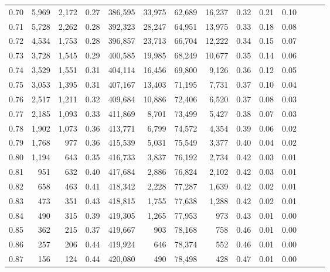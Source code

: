 \begin{tabular}{rrrrrrrrrrrrrr}
0.70 &   5,969 &  2,172 &  0.27 &  386,595 &   33,975 &  62,689 &  16,237 &  0.32 &  0.21 &      0.10 \\
0.71 &   5,728 &  2,262 &  0.28 &  392,323 &   28,247 &  64,951 &  13,975 &  0.33 &  0.18 &      0.08 \\
0.72 &   4,534 &  1,753 &  0.28 &  396,857 &   23,713 &  66,704 &  12,222 &  0.34 &  0.15 &      0.07 \\
0.73 &   3,728 &  1,545 &  0.29 &  400,585 &   19,985 &  68,249 &  10,677 &  0.35 &  0.14 &      0.06 \\
0.74 &   3,529 &  1,551 &  0.31 &  404,114 &   16,456 &  69,800 &   9,126 &  0.36 &  0.12 &      0.05 \\
0.75 &   3,053 &  1,395 &  0.31 &  407,167 &   13,403 &  71,195 &   7,731 &  0.37 &  0.10 &      0.04 \\
0.76 &   2,517 &  1,211 &  0.32 &  409,684 &   10,886 &  72,406 &   6,520 &  0.37 &  0.08 &      0.03 \\
0.77 &   2,185 &  1,093 &  0.33 &  411,869 &    8,701 &  73,499 &   5,427 &  0.38 &  0.07 &      0.03 \\
0.78 &   1,902 &  1,073 &  0.36 &  413,771 &    6,799 &  74,572 &   4,354 &  0.39 &  0.06 &      0.02 \\
0.79 &   1,768 &    977 &  0.36 &  415,539 &    5,031 &  75,549 &   3,377 &  0.40 &  0.04 &      0.02 \\
0.80 &   1,194 &    643 &  0.35 &  416,733 &    3,837 &  76,192 &   2,734 &  0.42 &  0.03 &      0.01 \\
0.81 &     951 &    632 &  0.40 &  417,684 &    2,886 &  76,824 &   2,102 &  0.42 &  0.03 &      0.01 \\
0.82 &     658 &    463 &  0.41 &  418,342 &    2,228 &  77,287 &   1,639 &  0.42 &  0.02 &      0.01 \\
0.83 &     473 &    351 &  0.43 &  418,815 &    1,755 &  77,638 &   1,288 &  0.42 &  0.02 &      0.01 \\
0.84 &     490 &    315 &  0.39 &  419,305 &    1,265 &  77,953 &     973 &  0.43 &  0.01 &      0.00 \\
0.85 &     362 &    215 &  0.37 &  419,667 &      903 &  78,168 &     758 &  0.46 &  0.01 &      0.00 \\
0.86 &     257 &    206 &  0.44 &  419,924 &      646 &  78,374 &     552 &  0.46 &  0.01 &      0.00 \\
0.87 &     156 &    124 &  0.44 &  420,080 &      490 &  78,498 &     428 &  0.47 &  0.01 &      0.00 \\

\end{tabular}
